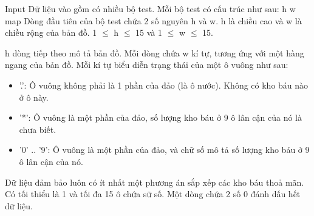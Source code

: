 Input
Dữ liệu vào gồm có nhiều bộ test. Mỗi bộ test có cấu trúc như sau: h w map Dòng đầu tiên của bộ test chứa 2 số nguyên h và w. h là chiều cao và w là chiều rộng của bản đồ. 1 $\le$ h $\le$ 15 và 1 $\le$ w $\le$ 15.

h dòng tiếp theo mô tả bản đồ. Mỗi dòng chứa w kí tự, tương ứng với một hàng ngang của bản đồ. Mỗi kí tự biểu diễn trạng thái của một ô vuông như sau:
\begin{itemize}
	\item '.': Ô vuông không phải là 1 phần của đảo (là ô nước). Không có kho báu nào ở ô này.
	\item '*': Ô vuông là một phần của đảo, số lượng kho báu ở 9 ô lân cận của nó là chưa biết.
	\item '0' .. '9': Ô vuông là một phần của đảo, và chữ số mô tả số lượng kho báu ở 9 ô lân cận của nó.
\end{itemize}

Dữ liệu đảm bảo luôn có ít nhất một phương án sắp xếp các kho báu thoả mãn. Có tối thiểu là 1 và tối đa 15 ô chứa sữ số. Một dòng chứa 2 số 0 đánh dấu hết dữ liệu.